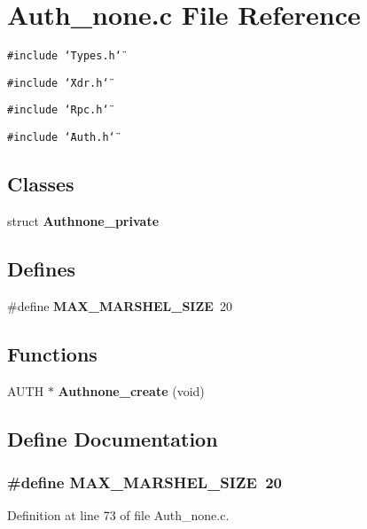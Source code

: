 \section{Auth\_\-none.c File Reference}
\label{Auth__none_8c}
{\tt \#include \char`\"{}Types.h\char`\"{}}\par
{\tt \#include \char`\"{}Xdr.h\char`\"{}}\par
{\tt \#include \char`\"{}Rpc.h\char`\"{}}\par
{\tt \#include \char`\"{}Auth.h\char`\"{}}\par
\subsection*{Classes}
\begin{CompactItemize}
\item 
struct {\bf Authnone\_\-private}
\end{CompactItemize}
\subsection*{Defines}
\begin{CompactItemize}
\item 
\#define {\bf MAX\_\-MARSHEL\_\-SIZE}\ 20
\end{CompactItemize}
\subsection*{Functions}
\begin{CompactItemize}
\item 
AUTH $\ast$ {\bf Authnone\_\-create} (void)
\end{CompactItemize}


\subsection{Define Documentation}
\subsubsection{\setlength{\rightskip}{0pt plus 5cm}\#define MAX\_\-MARSHEL\_\-SIZE\ 20}\label{Auth__none_8c_a0}




Definition at line 73 of file Auth\_\-none.c.

